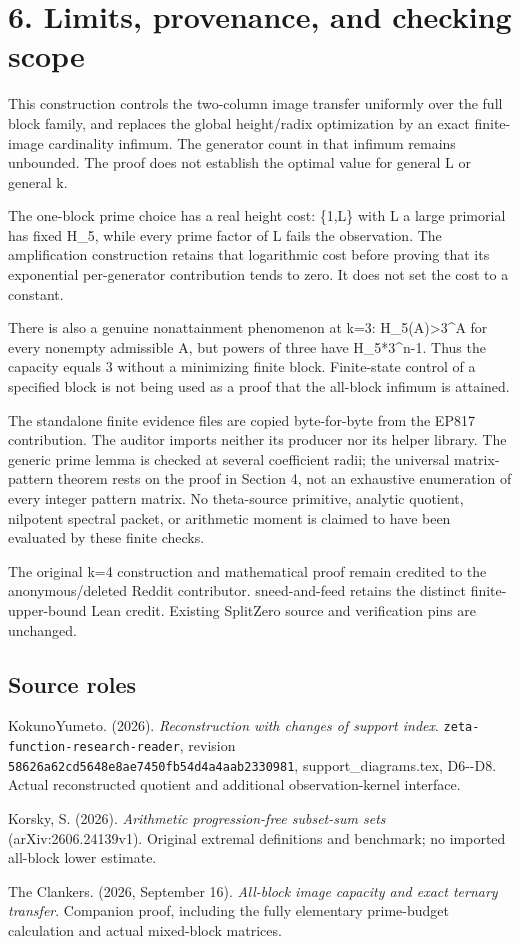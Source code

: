 \section{6. Limits, provenance, and checking scope}\label{n23-limits-provenance-and-checking-scope}

This construction controls the two-column image transfer uniformly over the full block family, and replaces the global height/radix optimization by an exact finite-image cardinality infimum. The generator count in that infimum remains unbounded. The proof does not establish the optimal value for general L or general k.

The one-block prime choice has a real height cost: \{1,L\} with L a large primorial has fixed \textbar H\_5, while every prime factor of L fails the observation. The amplification construction retains that logarithmic cost before proving that its exponential per-generator contribution tends to zero. It does not set the cost to a constant.

There is also a genuine nonattainment phenomenon at k=3: \textbar H\_5(A)\textbar\textgreater3\^{}\textbar A\textbar{} for every nonempty admissible A, but powers of three have \textbar H\_5*3\^{}n-1. Thus the capacity equals 3 without a minimizing finite block. Finite-state control of a specified block is not being used as a proof that the all-block infimum is attained.

The standalone finite evidence files are copied byte-for-byte from the EP817 contribution. The auditor imports neither its producer nor its helper library. The generic prime lemma is checked at several coefficient radii; the universal matrix-pattern theorem rests on the proof in Section 4, not an exhaustive enumeration of every integer pattern matrix. No theta-source primitive, analytic quotient, nilpotent spectral packet, or arithmetic moment is claimed to have been evaluated by these finite checks.

The original k=4 construction and mathematical proof remain credited to the anonymous/deleted Reddit contributor. sneed-and-feed retains the distinct finite-upper-bound Lean credit. Existing SplitZero source and verification pins are unchanged.

\subsection{Source roles}\label{n23-source-roles}

KokunoYumeto. (2026). \emph{Reconstruction with changes of support index}. \nolinkurl{zeta-function-research-reader}, revision \nolinkurl{58626a62cd5648e8ae7450fb54d4a4aab2330981}, support\_diagrams.tex, D6-\/-D8. Actual reconstructed quotient and additional observation-kernel interface.

Korsky, S. (2026). \emph{Arithmetic progression-free subset-sum sets} (arXiv:2606.24139v1). Original extremal definitions and benchmark; no imported all-block lower estimate.

The Clankers. (2026, September 16). \emph{All-block image capacity and exact ternary transfer}. Companion proof, including the fully elementary prime-budget calculation and actual mixed-block matrices.
